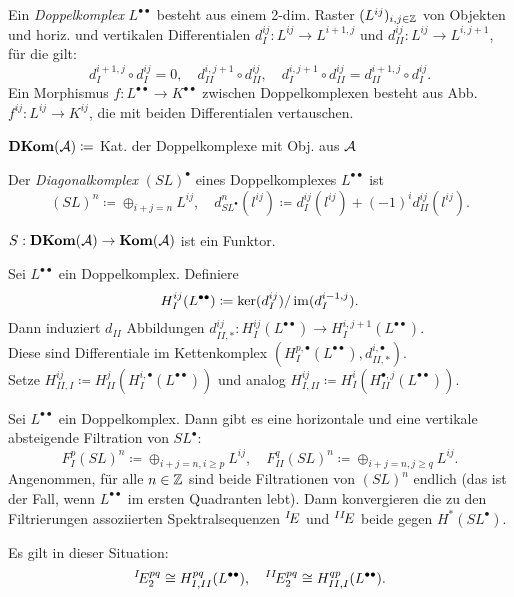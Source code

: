 \documentclass{cheat-sheet}
\newcommand{\CCC}[1]{{#1}^{\bullet}} %
\newcommand{\DC}[1]{{#1}^{\bullet \bullet}} %
\newcommand{\DKom}{\mathbf{DKom}} %
\begin{document}
\begin{defn}
  Ein \emph{Doppelkomplex} $\DC{L}$ besteht aus einem 2-dim. Raster $(L^{ij})_{i, j \in \mathbb{Z}}$ von Objekten und horiz. und vertikalen Differentialen $d^{ij}_I : L^{ij} \to L^{i+1,j}$ und $d^{ij}_{II} : L^{ij} \to L^{i,j+1}$, für die gilt:
  \[
    d^{i+1,j}_I \circ d^{ij}_I = 0, \quad
    d^{i,j+1}_{II} \circ d^{ij}_{II}, \quad
    d^{i,j+1}_I \circ d^{ij}_{II} = d^{i+1,j}_{II} \circ d^{ij}_I.
  \]
  Ein Morphismus $f : \DC{L} \to \DC{K}$ zwischen Doppelkomplexen besteht aus Abb. $f^{ij} : L^{ij} \to K^{ij}$, die mit beiden Differentialen vertauschen.
\end{defn}

\begin{nota}
  $\DKom(\Aat) \coloneqq $ Kat. der Doppelkomplexe mit Obj. aus $\mathcal{A}$
\end{nota}

\begin{defn}
  Der \emph{Diagonalkomplex} $\CCC{(SL)}$ eines Doppelkomplexes $\DC{L}$ ist
  \[
    (SL)^n \coloneqq \oplus_{i+j=n} L^{ij}, \quad
    d^n_{\CCC{SL}}(l^{ij}) \coloneqq d^{ij}_I(l^{ij}) + (-1)^i d^{ij}_{II}(l^{ij}).
  \]
\end{defn}

\begin{bem}
  $S : \DKom(\Aat) \to \Kom(\Aat)$ ist ein Funktor.
\end{bem}


\begin{defn}
  Sei $\DC{L}$ ein Doppelkomplex. Definiere
  \[
    H^{ij}_I(\DC{L}) \coloneqq \ker(d^{ij}_I) / \im(d^{i-1,j}_I).
  \]
  Dann induziert $d_{II}$ Abbildungen $d^{ij}_{II,*} : H^{ij}_I(\DC{L}) \to H^{i,j+1}_I(\DC{L})$. \\
  Diese sind Differentiale im Kettenkomplex $(H_I^{p,\bullet}(\DC{L}), d^{i, \bullet}_{II,*})$. \\
  Setze $H^{ij}_{II,I} \coloneqq H_{II}^{j}(H_I^{i,\bullet}(\DC{L}))$
  und analog $H^{ij}_{I,II} \coloneqq H_{I}^{i}(H_{II}^{\bullet,j}(\DC{L}))$.
\end{defn}

\begin{bem}
  Sei $\DC{L}$ ein Doppelkomplex. Dann gibt es eine horizontale und eine vertikale absteigende Filtration von $\CCC{SL}$:
  \[
    F^p_I(SL)^n \coloneqq \oplus_{i+j=n,i \geq p} L^{ij}, \quad
    F^q_{II}(SL)^n \coloneqq \oplus_{i+j=n,j \geq q} L^{ij}.
  \]
  Angenommen, für alle $n \in \mathbb{Z}$ sind beide Filtrationen von $(SL)^n$ endlich (das ist \zB{} der Fall, wenn $\DC{L}$ im ersten Quadranten lebt).
  Dann konvergieren die zu den Filtrierungen assoziierten Spektralsequenzen $\prescript{I}{}\!E$ und $\prescript{II}{}\!E$ beide gegen $H^*(\CCC{SL})$.
\end{bem}

\begin{prop}
  Es gilt in dieser Situation:
  \[
    \prescript{I}{}\!E^{pq}_2 \cong H^{pq}_{I,II}(\DC{L}), \quad
    \prescript{II}{}\!E^{pq}_2 \cong H^{qp}_{II,I}(\DC{L}).
  \]
\end{prop}

\end{document}
